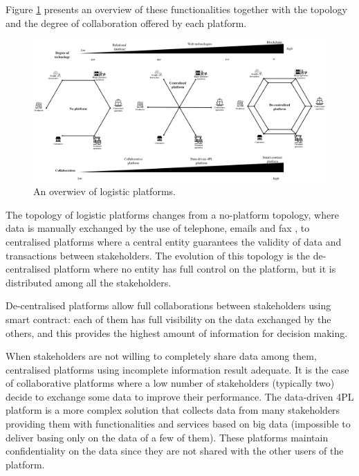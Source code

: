 Figure \ref{fig_platforms} presents an overview of these functionalities together with the topology and the degree of collaboration offered by each platform.

\begin{landscape}
\thispagestyle{empty}
\begin{figure}[hbt!]
\centering
\includegraphics[width=1.6\textwidth]{SectionDistribution/control_figures/fig_platforms.png}
\captionsetup{type=figure}
\caption{An overwiev of logistic platforms.}
\label{fig_platforms}
\end{figure}
\end{landscape}

The topology of logistic platforms changes from a no-platform topology, where data is manually exchanged by the use of telephone, emails and fax \cite{Choy2006, Liu2008}, to centralised platforms where a central entity guarantees the validity of data and transactions between stakeholders. The evolution of this topology is the de-centralised platform where no entity has full control on the platform, but it is distributed among all the stakeholders.\par

De-centralised platforms allow full collaborations between stakeholders using smart contract: each of them has full visibility on the data exchanged by the others, and this provides the highest amount of information for decision making.\par

When stakeholders are not willing to completely share data among them, centralised platforms using incomplete information result adequate. It is the case of collaborative platforms where a low number of stakeholders (typically two) decide to exchange some data to improve their performance. The data-driven 4PL platform is a more complex solution that collects data from many stakeholders providing them with functionalities and services based on big data (impossible to deliver basing only on the data of a few of them). These platforms maintain confidentiality on the data since they are not shared with the other users of the platform.\par

